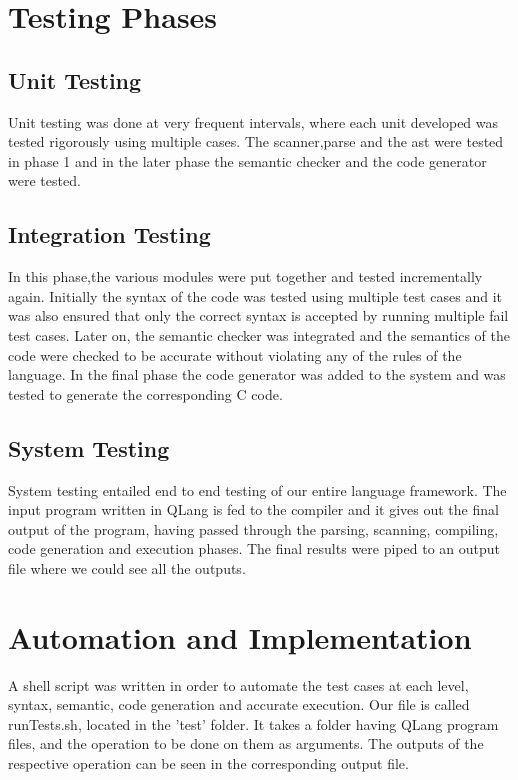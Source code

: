 \section{Testing Phases}

\subsection{Unit Testing}
Unit testing was done at very frequent intervals, where each unit developed was tested rigorously using
multiple cases. The scanner,parse and the ast were tested in phase 1 and in the later phase the semantic
checker and the code generator were tested.


\subsection{Integration Testing}
In this phase,the various modules were put together and tested incrementally again. Initially the syntax of the
code was tested using multiple test cases and it was also ensured that only the correct syntax is
accepted by running multiple fail test cases. Later on, the semantic checker was integrated and the
semantics of the code were checked to be accurate without violating any of the rules of the language.
In the final phase the code generator was added to the system and was tested to generate the
corresponding C code. 

\subsection{System Testing}
System testing entailed end to end testing of our entire language framework. The input program written in QLang is fed to the compiler and it gives out the final output of the program, having passed through the parsing, scanning, compiling, code generation and execution phases. The final results were piped to an output file where we could see all the outputs.


\section{Automation and Implementation}
A shell script was written in order to automate the test cases at each level, syntax, semantic, code
generation and accurate execution. 
Our file is called runTests.sh, located in the 'test' folder. It takes a folder having QLang program files, and the operation to be done on them as arguments. The outputs of the respective operation can be seen in the corresponding output file. 


